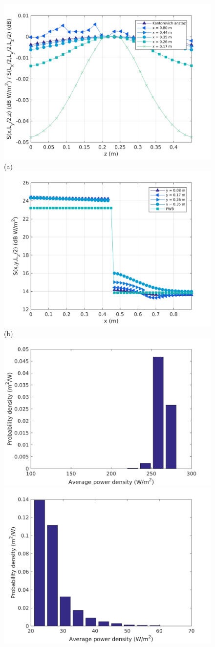 \documentclass[a4paper]{article}
\numberwithin{equation}{section}
\begin{document}
\begin{figure}[hp]
\begin{center}
\includegraphics[width=0.6\linewidth]{figures/DDM-EEBC_3D_DL_PowerDensityProfileZ}\\
{\footnotesize (a)}\\
\vspace{2mm}
\includegraphics[width=0.6\linewidth]{figures/DDM-EEBC_3D_DL_PowerDensityProfileX}\\
{\footnotesize (b)}\\
\vspace{2mm}
\includegraphics[width=0.45\linewidth]{figures/DDM-EEBC_3D_DL_PowerDensityPDF1}
\includegraphics[width=0.45\linewidth]{figures/DDM-EEBC_3D_DL_PowerDensityPDF2}

\end{center}
\end{figure}
\end{document}
